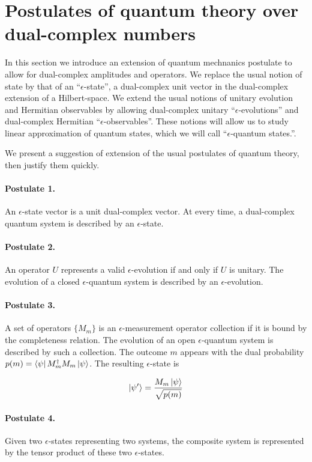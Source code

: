 \documentclass{article}
\newcommand{\e}{\epsilon}
\begin{document}
\section{Postulates of quantum theory over dual-complex numbers}

In this section we introduce an extension of quantum mechnanics postulate to allow for dual-complex amplitudes and operators.
We replace the usual notion of state by that of an ``$\e$-state'', a dual-complex unit vector in the dual-complex extension of a Hilbert-space. We extend the usual notions of unitary evolution and Hermitian observables by allowing dual-complex unitary ``$\e$-evolutions'' and dual-complex Hermitian ``$\e$-observables''.
These notions will allow us to study linear approximation of quantum states, which we will call ``$\e$-quantum states.''.

We present a suggestion of extension of the usual postulates of quantum theory, then justify them quickly.

\paragraph{Postulate 1.} An $\e$-state vector is a unit dual-complex vector. At every time, a dual-complex quantum system is described by an $\e$-state.
\paragraph{Postulate 2.} An operator $U$ represents a valid $\e$-evolution if and only if $U$ is unitary. The evolution of a closed $\e$-quantum system is described by an $\e$-evolution.
\paragraph{Postulate 3.} A set of operators $\{M_m\}$ is an $\e$-measurement operator collection if it is bound by the completeness relation. The evolution of an open $\e$-quantum system is described by such a collection. The outcome $m$ appears with the dual probability $p(m) = \bra\psi M_m^\dagger M_m \ket\psi$. The resulting $\e$-state is

\begin{equation}\label{def:meas}
 \ket{\psi'} = \frac{M_m \ket\psi}{\sqrt{p(m)}}
\end{equation}

\paragraph{Postulate 4.} Given two $\e$-states representing two systems, the composite system is represented by the tensor product of these two $\e$-states.
\\
\end{document}
